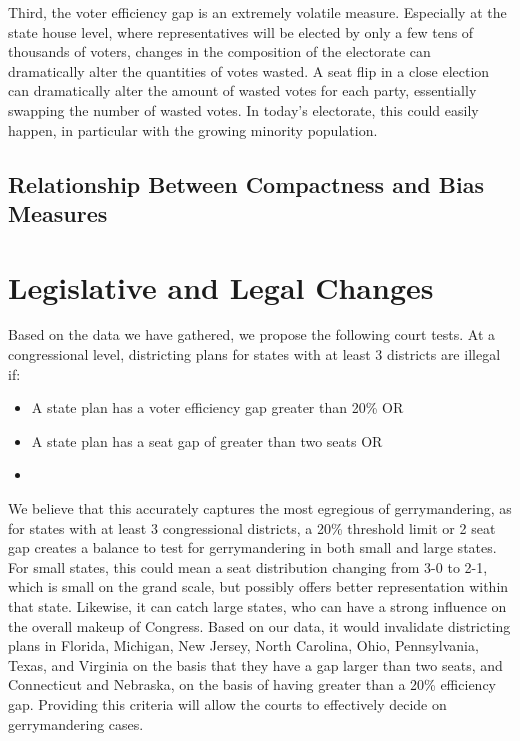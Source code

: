 \documentclass[12pt]{article}
\begin{document}
  Third, the voter efficiency gap is an extremely volatile measure.  Especially at the state house level, where representatives will be elected by only a few tens of thousands of voters, changes in the composition of the electorate can dramatically alter the quantities of votes wasted.  A seat flip in a close election can dramatically alter the amount of wasted votes for each party, essentially swapping the number of wasted votes.  In today's electorate, this could easily happen, in particular with the growing minority population.
  
  \subsection{Relationship Between Compactness and Bias Measures}


  \section{Legislative and Legal Changes}
  
  Based on the data we have gathered, we propose the following court tests.  At a congressional level, districting plans for states with at least 3 districts are illegal if:
  \begin{itemize}
  \item A state plan has a voter efficiency gap greater than 20\% OR
  \item A state plan has a seat gap of greater than two seats OR
  \item%
  \end{itemize}
  
  We believe that this accurately captures the most egregious of gerrymandering, as for states with at least 3 congressional districts, a 20\% threshold limit or 2 seat gap creates a balance to test for gerrymandering in both small and large states.  For small states, this could mean a seat distribution changing from 3-0 to 2-1, which is small on the grand scale, but possibly offers better representation within that state. Likewise, it can catch large states, who can have a strong influence on the overall makeup of Congress.  Based on our data, it would invalidate districting plans in Florida, Michigan, New Jersey, North Carolina, Ohio, Pennsylvania, Texas, and Virginia on the basis that they have a gap larger than two seats, and Connecticut and Nebraska, on the basis of having greater than a 20\% efficiency gap. Providing this criteria will allow the courts to effectively decide on gerrymandering cases.\\
\end{document}
